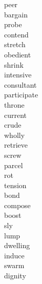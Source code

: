 \documentclass[a4paper, 11pt]{ctexart}
\begin{document}
\begin{multicols*}{3}
\begin{description}
\item[peer]

\item[bargain]

\item[probe]

\item[contend]

\item[stretch]

\item[obedient]

\item[shrink]

\item[intensive]

\item[consultant]

\item[participate]

\item[throne]

\item[current]

\item[crude]

\item[wholly]

\item[retrieve]

\item[screw]

\item[parcel]

\item[rot]

\item[tension]

\item[bond]

\item[compose]

\item[boost]

\item[sly]

\item[lump]

\item[dwelling]

\item[induce]

\item[swarm]

\item[dignity]


\end{description}
\end{multicols*}
\end{document}
